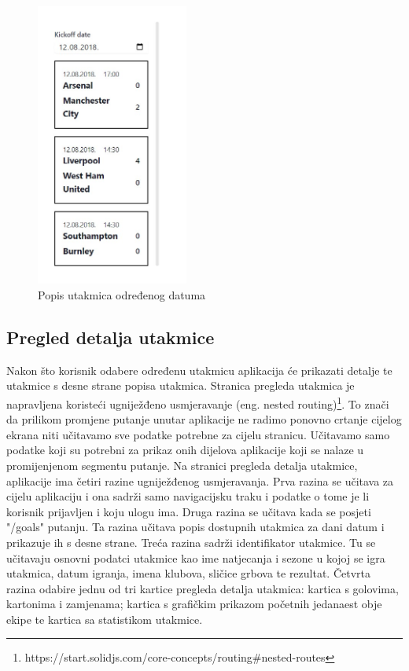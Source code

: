 \documentclass[times, utf8, zavrsni]{fer}
\begin{document}
\begin{figure}[htb]
\centering
\includegraphics[width=5cm]{images/game-list.jpg}
\caption{Popis utakmica određenog datuma}
\label{fig:games-list}
\end{figure}

\subsection{Pregled detalja utakmice}

Nakon što korisnik odabere određenu utakmicu aplikacija će prikazati detalje te utakmice s desne strane popisa utakmica.
Stranica pregleda utakmica je napravljena koristeći ugniježđeno usmjeravanje (eng. nested routing)\footnote{https://start.solidjs.com/core-concepts/routing\#nested-routes}.
To znači da prilikom promjene putanje unutar aplikacije ne radimo ponovno crtanje cijelog ekrana niti učitavamo sve podatke potrebne za cijelu stranicu.
Učitavamo samo podatke koji su potrebni za prikaz onih dijelova aplikacije koji se nalaze u promijenjenom segmentu putanje.
Na stranici pregleda detalja utakmice, aplikacije ima četiri razine ugniježđenog usmjeravanja.
Prva razina se učitava za cijelu aplikaciju i ona sadrži samo navigacijsku traku i podatke o tome je li korisnik prijavljen i koju ulogu ima.
Druga razina se učitava kada se posjeti "/goals" putanju. Ta razina učitava popis dostupnih utakmica za dani datum i prikazuje ih s desne strane.
Treća razina sadrži identifikator utakmice. Tu se učitavaju osnovni podatci utakmice kao ime natjecanja i sezone u kojoj se igra utakmica, datum igranja, imena klubova, sličice grbova te rezultat.
Četvrta razina odabire jednu od tri kartice pregleda detalja utakmica: kartica s golovima, kartonima i zamjenama; kartica s grafičkim prikazom početnih jedanaest obje ekipe te kartica sa statistikom utakmice.
\end{document}
